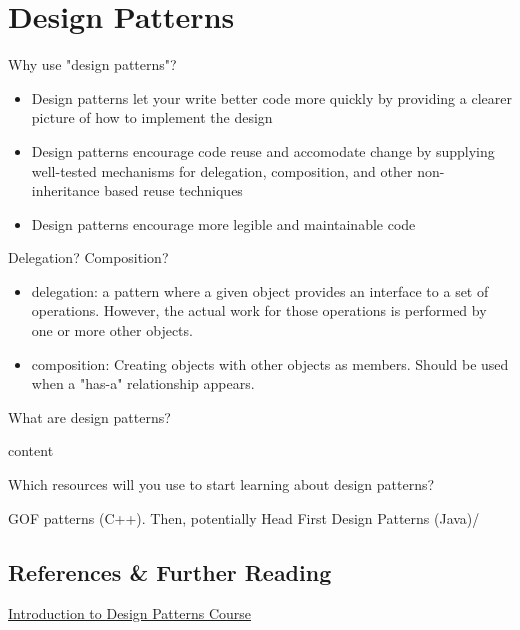 \section{Design Patterns}



\begin{quest}
\item Why use "design patterns"?
\begin{ans}
\begin{itemize}
	\item Design patterns let your write better code more quickly by providing a clearer picture of how to implement the design
	\item Design patterns encourage code reuse and accomodate change by supplying well-tested mechanisms for delegation, composition, and other non-inheritance based reuse techniques
	\item Design patterns encourage more legible and maintainable code
\end{itemize}
\end{ans}

\item Delegation? Composition?
\begin{ans}
\begin{itemize}
	\item delegation: a pattern where a given object provides an interface to a set of operations. However, the actual work for those operations is performed by one or more other objects.
	\item composition: Creating objects with other objects as members. Should be used when a "has-a" relationship appears.
\end{itemize}
\end{ans}

\item What are design patterns?
\begin{ans}
	content

\end{ans}

\item Which resources will you use to start learning about design patterns?
\begin{ans}
	GOF patterns (C++). Then, potentially Head First Design Patterns (Java)/
\end{ans}
\end{quest}

\subsection{References \& Further Reading}

\href{https://www.gofpatterns.com/design-patterns/module1/intro-design-patterns.php}{Introduction to Design Patterns Course}


